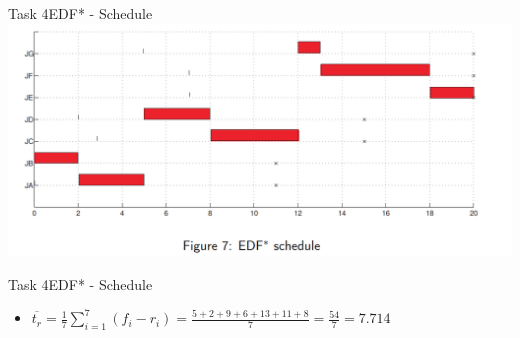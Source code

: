 \begin{frame}{Task 4}{EDF* - Schedule}
    \includegraphics[width = \linewidth]{figures/edf-star-schedule-2.PNG}
\end{frame}

\begin{frame}[allowframebreaks]{Task 4}{EDF* - Schedule}
  \begin{solution}
  \begin{itemize}
    \item $\displaystyle \overline{t_r}=\frac{1}{7} \sum_{i=1}^7\left(f_i-r_i\right)=\frac{5+2+9+6+13+11+8}{7}=\frac{54}{7}=7.714$
  \end{itemize}
  \end{solution}
\end{frame}

